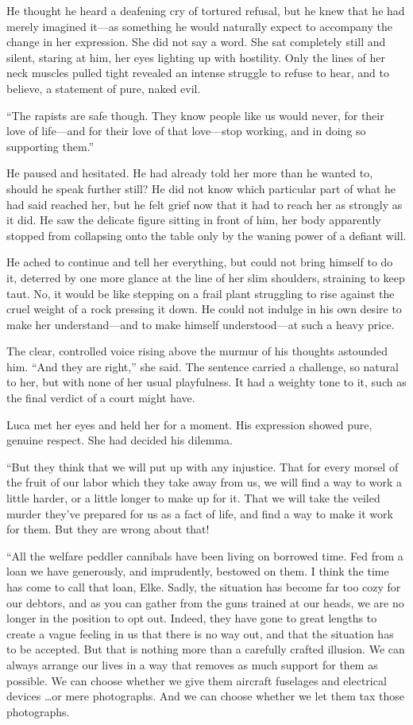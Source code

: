 He thought he heard a deafening cry of tortured refusal, but he knew that he had merely imagined it---as something he would naturally expect to accompany the change in her expression. She did not say a word. She sat completely still and silent, staring at him, her eyes lighting up with hostility. Only the lines of her neck muscles pulled tight revealed an intense struggle to refuse to hear, and to believe, a statement of pure, naked evil.

``The rapists are safe though. They know people like us would never, for their love of life---and for their love of that love---stop working, and in doing so supporting them.''

He paused and hesitated. He had already told her more than he wanted to, should he speak further still? He did not know which particular part of what he had said reached her, but he felt grief now that it had to reach her as strongly as it did. He saw the delicate figure sitting in front of him, her body apparently stopped from collapsing onto the table only by the waning power of a defiant will.

He ached to continue and tell her everything, but could not bring himself to do it, deterred by one more glance at the line of her slim shoulders, straining to keep taut. No, it would be like stepping on a frail plant struggling to rise against the cruel weight of a rock pressing it down. He could not indulge in his own desire to make her understand---and to make himself understood---at such a heavy price.

The clear, controlled voice rising above the murmur of his thoughts astounded him. ``And they are right,'' she said. The sentence carried a challenge, so natural to her, but with none of her usual playfulness. It had a weighty tone to it, such as the final verdict of a court might have.

Luca met her eyes and held her for a moment. His expression showed pure, genuine respect. She had decided his dilemma.

``But they think that we will put up with any injustice. That for every morsel of the fruit of our labor which they take away from us, we will find a way to work a little harder, or a little longer to make up for it. That we will take the veiled murder they've prepared for us as a fact of life, and find a way to make it work for them. But they are wrong about that!

``All the welfare peddler cannibals have been living on borrowed time. Fed from a loan we have generously, and imprudently, bestowed on them. I think the time has come to call that loan, Elke. Sadly, the situation has become far too cozy for our debtors, and as you can gather from the guns trained at our heads, we are no longer in the position to opt out. Indeed, they have gone to great lengths to create a vague feeling in us that there is no way out, and that the situation has to be accepted. But that is nothing more than a carefully crafted illusion. We can always arrange our lives in a way that removes as much support for them as possible. We can choose whether we give them aircraft fuselages and electrical devices \ldots or mere photographs. And we can choose whether we let them tax those photographs.


